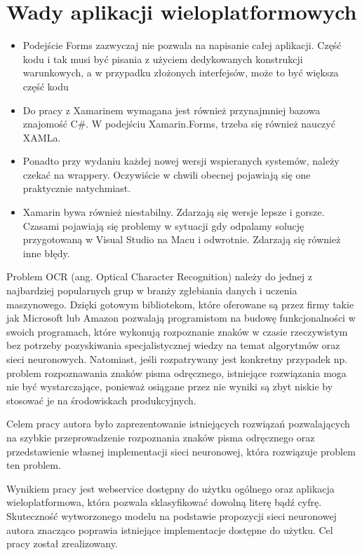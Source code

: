 \documentclass[brudnopis]{xmgr}
\begin{document}
\section{Wady aplikacji wieloplatformowych}

\begin{itemize}
\item
Podejście Forms zazwyczaj nie pozwala na napisanie całej aplikacji. Część kodu i tak musi być pisania z użyciem dedykowanych konstrukcji warunkowych, a w przypadku złożonych interfejsów, może to być większa część kodu
\item
Do pracy z Xamarinem wymagana jest również przynajmniej bazowa znajomość C\#. W podejściu Xamarin.Forms, trzeba się również nauczyć XAMLa.
\item
Ponadto przy wydaniu każdej nowej wersji wspieranych systemów, należy czekać na wrappery. Oczywiście w chwili obecnej pojawiają się one praktycznie natychmiast.
\item
Xamarin bywa również niestabilny. Zdarzają się wersje lepsze i gorsze. Czasami pojawiają się problemy w sytuacji gdy odpalamy solucję przygotowaną w Visual Studio na Macu i odwrotnie. Zdarzają się również inne błędy.

\end{itemize}

\summary

Problem OCR (ang. Optical Character Recognition) należy do jednej z najbardziej popularnych grup w branży zgłebiania danych i uczenia maszynowego. Dzięki gotowym bibliotekom, które oferowane są przez firmy takie jak Microsoft lub Amazon pozwalają programistom na budowę funkcjonalności w swoich programach, które wykonują rozpoznanie znaków w czasie rzeczywistym bez potrzeby pozyskiwania specjalistycznej wiedzy na temat algorytmów oraz sieci neuronowych. Natomiast, jeśli rozpatrywany jest konkretny przypadek np. problem rozpoznawania znaków pisma odręcznego, istniejące rozwiązania moga nie być wystarczające, ponieważ osiągane przez nie wyniki są zbyt niskie by stosować je na środowiskach produkcyjnych.

Celem pracy autora było zaprezentowanie istniejących rozwiązań pozwalających na szybkie przeprowadzenie rozpoznania znaków pisma odręcznego oraz przedstawienie własnej implementacji sieci neuronowej, która rozwiązuje problem ten problem. 

Wynikiem pracy jest webservice dostępny do użytku ogólnego oraz aplikacja wieloplatformowa, która pozwala sklasyfikować dowolną literę bądź cyfrę. Skuteczność wytworzonego modelu na podstawie propozycji sieci neuronowej autora znacząco poprawia istniejące implementacje dostępne do użytku. Cel pracy został zrealizowany.
\end{document}
